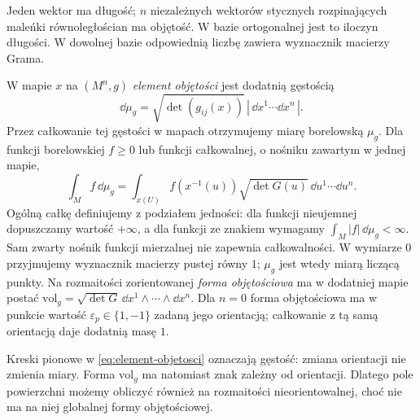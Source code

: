 Jeden wektor ma długość; $n$ niezależnych
wektorów stycznych rozpinających maleńki
równoległościan ma objętość. W bazie
ortogonalnej jest to iloczyn długości.
W dowolnej bazie odpowiednią liczbę
zawiera wyznacznik macierzy Grama.

\begin{definicja}
\label{def:miara-riemannowska}
W mapie $x$ na $(M^n,g)$ \emph{element objętości}
jest dodatnią gęstością
\begin{equation}\label{eq:element-objetosci}
 \dd\mu_g=\sqrt{\det(g_{ij}(x))}\,
                 |\,\dd x^1\cdots\dd x^n\,|.
\end{equation}
Przez całkowanie tej gęstości w mapach
otrzymujemy miarę borelowską $\mu_g$.
Dla funkcji borelowskiej $f\geq0$ lub funkcji całkowalnej,
o nośniku zawartym w jednej mapie,
\[
 \int_M f\,\dd\mu_g
  =\int_{x(U)} f(x^{-1}(u))
      \sqrt{\det G(u)}\,\dd u^1\cdots\dd u^n.
\]
Ogólną całkę definiujemy z podziałem jedności:
dla funkcji nieujemnej dopuszczamy wartość $+\infty$,
a dla funkcji ze znakiem wymagamy $\int_M|f|\,\dd\mu_g<\infty$.
Sam zwarty nośnik funkcji mierzalnej nie zapewnia całkowalności.
W wymiarze $0$ przyjmujemy wyznacznik macierzy pustej równy $1$;
$\mu_g$ jest wtedy miarą liczącą punkty. Na rozmaitości zorientowanej
\emph{forma objętościowa} ma w dodatniej mapie postać
$\mathrm{vol}_g=\sqrt{\det G}\,
 \dd x^1\wedge\cdots\wedge\dd x^n$.
Dla $n=0$ forma objętościowa ma w punkcie wartość
$\varepsilon_p\in\{1,-1\}$ zadaną jego orientacją;
całkowanie z tą samą orientacją daje dodatnią masę $1$.
\end{definicja}

Kreski pionowe w \eqref{eq:element-objetosci}
oznaczają gęstość: zmiana orientacji nie zmienia
miary. Forma $\mathrm{vol}_g$ ma natomiast znak
zależny od orientacji. Dlatego pole powierzchni
możemy obliczyć również na rozmaitości
nieorientowalnej, choć nie ma na niej globalnej
formy objętościowej.

